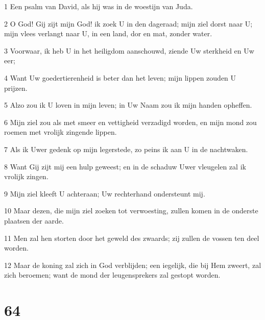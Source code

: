 \par 1 Een psalm van David, als hij was in de woestijn van Juda.
\par 2 O God! Gij zijt mijn God! ik zoek U in den dageraad; mijn ziel dorst naar U; mijn vlees verlangt naar U, in een land, dor en mat, zonder water.
\par 3 Voorwaar, ik heb U in het heiligdom aanschouwd, ziende Uw sterkheid en Uw eer;
\par 4 Want Uw goedertierenheid is beter dan het leven; mijn lippen zouden U prijzen.
\par 5 Alzo zou ik U loven in mijn leven; in Uw Naam zou ik mijn handen opheffen.
\par 6 Mijn ziel zou als met smeer en vettigheid verzadigd worden, en mijn mond zou roemen met vrolijk zingende lippen.
\par 7 Als ik Uwer gedenk op mijn legerstede, zo peins ik aan U in de nachtwaken.
\par 8 Want Gij zijt mij een hulp geweest; en in de schaduw Uwer vleugelen zal ik vrolijk zingen.
\par 9 Mijn ziel kleeft U achteraan; Uw rechterhand ondersteunt mij.
\par 10 Maar dezen, die mijn ziel zoeken tot verwoesting, zullen komen in de onderste plaatsen der aarde.
\par 11 Men zal hen storten door het geweld des zwaards; zij zullen de vossen ten deel worden.
\par 12 Maar de koning zal zich in God verblijden; een iegelijk, die bij Hem zweert, zal zich beroemen; want de mond der leugensprekers zal gestopt worden.

\chapter{64}

